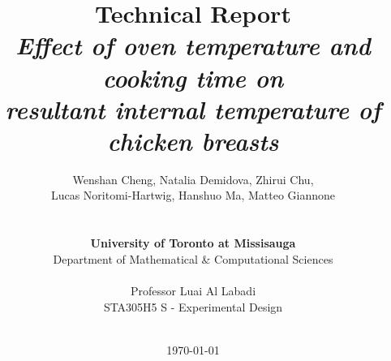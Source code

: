 \documentclass[a4paper]{article}
\begin{document}
\title{{\Huge \textbf{Technical Report}{\large\linebreak\\}}{\Large \textit{Effect of oven temperature and cooking time on \\resultant internal temperature of chicken breasts}\linebreak\linebreak}}

\author{Wenshan Cheng, Natalia Demidova, Zhirui Chu, \\ Lucas Noritomi-Hartwig, Hanshuo Ma, Matteo Giannone
\\ \\ \\
\textbf{University of Toronto at Missisauga} \\
Department of Mathematical \& Computational Sciences \\ \\
Professor Luai Al Labadi \\
STA305H5 S - Experimental Design \\ \\}
\date{\today}

\maketitle

\newpage
\tableofcontents\label{c}
\newpage

\end{document}
